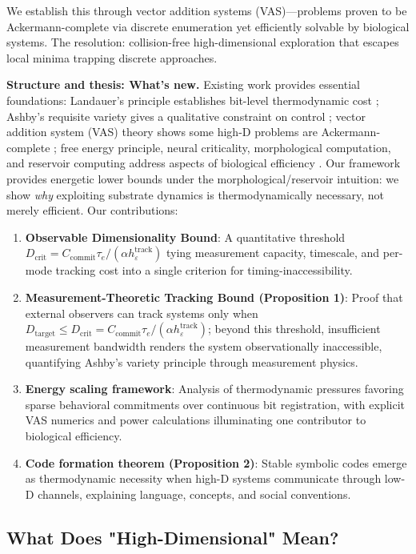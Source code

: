 \documentclass[12pt]{article}
\begin{document}
We establish this through vector addition systems (VAS)---problems proven to be Ackermann-complete via discrete enumeration yet efficiently solvable by biological systems. The resolution: collision-free high-dimensional exploration that escapes local minima trapping discrete approaches.

\textbf{Structure and thesis: What's new.} Existing work provides essential foundations: Landauer's principle establishes bit-level thermodynamic cost \cite{landauer1961}; Ashby's requisite variety gives a qualitative constraint on control \cite{ashby1956}; vector addition system (VAS) theory shows some high-D problems are Ackermann-complete \cite{leroux2013}; free energy principle, neural criticality, morphological computation, and reservoir computing address aspects of biological efficiency \cite{friston2010,beggs2003,enel2016reservoir}. Our framework provides energetic lower bounds under the morphological/reservoir intuition: we show \textit{why} exploiting substrate dynamics is thermodynamically necessary, not merely efficient. Our contributions:
\begin{enumerate}
\item \textbf{Observable Dimensionality Bound}: A quantitative threshold $D_{\text{crit}} = C_{\text{commit}}\tau_e / (\alpha h_\varepsilon^{\text{track}})$ tying measurement capacity, timescale, and per-mode tracking cost into a single criterion for timing-inaccessibility.
\item \textbf{Measurement-Theoretic Tracking Bound (Proposition 1)}: Proof that external observers can track systems only when $D_{\text{target}} \le D_{\text{crit}} = C_{\text{commit}}\tau_e/(\alpha h_\varepsilon^{\text{track}})$; beyond this threshold, insufficient measurement bandwidth renders the system observationally inaccessible, quantifying Ashby's variety principle through measurement physics.
\item \textbf{Energy scaling framework}: Analysis of thermodynamic pressures favoring sparse behavioral commitments over continuous bit registration, with explicit VAS numerics and power calculations illuminating one contributor to biological efficiency.
\item \textbf{Code formation theorem (Proposition 2)}: Stable symbolic codes emerge as thermodynamic necessity when high-D systems communicate through low-D channels, explaining language, concepts, and social conventions.
\end{enumerate}

\subsection{What Does "High-Dimensional" Mean?}
\end{document}
